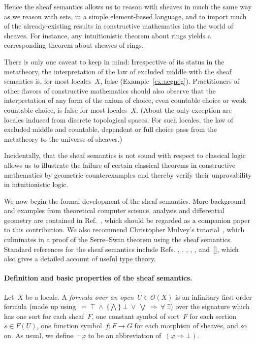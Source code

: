 \documentclass{ws-rv9x6}
\renewcommand{\O}{\mathcal{O}}
\renewcommand{\_}{\mathpunct{.}}
\newcommand{\?}{\,{:}\,}
\begin{document}
Hence the sheaf semantics allows us to reason with sheaves in much the same way
as we reason with sets, in a simple element-based language, and to import much
of the already-existing results in constructive mathematics into the world of
sheaves. For instance, any intuitionistic theorem about rings yields a
corresponding theorem about sheaves of rings.

There is only one caveat to keep in mind: Irrespective of its status in the
metatheory, the interpretation of the law of excluded middle with the sheaf
semantics is, for most locales~$X$, false (Example~\ref{ex:negneg}).
Practitioners of other flavors of constructive mathematics should also observe
that the interpretation of any form of the axiom of choice, even countable
choice or weak countable choice, is false for most locales~$X$. (About the only
exception are locales induced from discrete topological spaces. For such
locales, the law of excluded middle and countable, dependent or full choice
pass from the metatheory to the universe of sheaves.)

Incidentally, that the sheaf semantics is not sound with respect to classical
logic allows us to illustrate the failure of certain classical theorems in
constructive mathematics by geometric counterexamples and thereby verify their
unprovability in intuitionistic logic.

We now begin the formal development of the sheaf semantics. More background and
examples from theoretical computer science, analysis and differential geometry
are contained in Ref.~, which should be
regarded as a companion paper to this contribution. We also recommend
Christopher Mulvey's tutorial~\cite{mulvey:repr}, which culminates in a proof
of the Serre--Swan theorem using the sheaf semantics. Standard references for
the sheaf semantics include Refs.
\cite[Chapter~VI]{moerdijk-maclane:sheaves-logic},
\cite[Chapter~14]{goldblatt:topoi},
\cite[Section~5]{caramello:preliminaries},
\cite[Sections~12--15]{streicher:ctcl},
\cite[Chapter~6]{borceux:handbook3},
\cite[Part~D]{johnstone:elephant} and~[],
which also gives a detailed account of useful type theory.

\paragraph{Definition and basic properties of the sheaf semantics.}
Let~$X$ be a locale. A \emph{formula over an open~$U \in \O(X)$} is an
infinitary first-order formula (made up using~${=}\ {\top}\ {\wedge}\ \{\bigwedge\}\ {\bot}\ {\vee}\
{\bigvee}\ {\Rightarrow}\ {\forall}\ {\exists}$) over the signature which has one sort for
each sheaf~$F$, one constant symbol of sort~$F$ for each section~$s \in F(U)$,
one function symbol~$f : F \to G$ for each morphism of sheaves, and so on. As
usual, we define~$\neg\varphi$ to be an abbreviation of~$(\varphi \Rightarrow
\bot)$.
\end{document}
